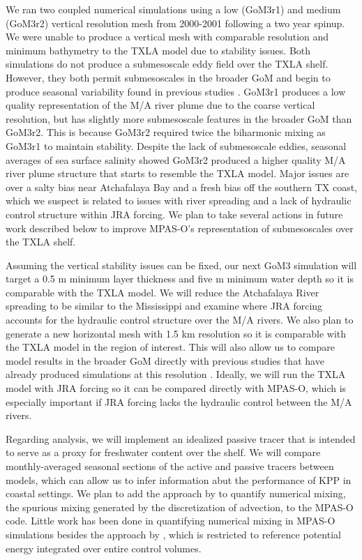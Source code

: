 We ran two coupled numerical simulations using a low (GoM3r1) and medium (GoM3r2) vertical resolution mesh from 2000-2001 following a two year spinup. We were unable to produce a vertical mesh with comparable resolution and minimum bathymetry to the TXLA model due to stability issues. Both simulations do not produce a submesoscale eddy field over the TXLA shelf. However, they both permit submesoscales in the broader GoM and begin to produce seasonal variability found in previous studies \citep{Barkan_2017, liu2021submesoscale}. GoM3r1 produces a low quality representation of the M/A river plume due to the coarse vertical resolution, but has slightly more submesoscale features in the broader GoM than GoM3r2. This is because GoM3r2 required twice the biharmonic mixing as GoM3r1 to maintain stability. Despite the lack of submesoscale eddies, seasonal averages of sea surface salinity showed GoM3r2 produced a higher quality M/A river plume structure that starts to resemble the TXLA model. Major issues are over a salty bias near Atchafalaya Bay and a fresh bias off the southern TX coast, which we suspect is related to issues with river spreading and a lack of hydraulic control structure within JRA forcing. We plan to take several actions in future work described below to improve MPAS-O's representation of submesoscales over the TXLA shelf.

Assuming the vertical stability issues can be fixed, our next GoM3 simulation will target a 0.5 m minimum layer thickness and five m minimum water depth so it is comparable with the TXLA model. We will reduce the Atchafalaya River spreading to be similar to the Mississippi and examine where JRA forcing accounts for the hydraulic control structure over the M/A rivers. We also plan to generate a new horizontal mesh with 1.5 km resolution so it is comparable with the TXLA model in the region of interest. This will also allow us to compare model results in the broader GoM directly with previous studies that have already produced simulations at this resolution \citep{Barkan_2017, bracco2019mesoscale, liu2021submesoscale}. Ideally, we will run the TXLA model with JRA forcing so it can be compared directly with MPAS-O, which is especially important if JRA forcing lacks the hydraulic control between the M/A rivers. 

Regarding analysis, we will implement an idealized passive tracer that is intended to serve as a proxy for freshwater content over the shelf. We will compare monthly-averaged seasonal sections of the active and passive tracers between models, which can allow us to infer information abut the performance of KPP in coastal settings. We plan to add the approach by \cite{Klingbeil_2014} to quantify numerical mixing, the spurious mixing generated by the discretization of advection, to the MPAS-O code. Little work has been done in quantifying numerical mixing in MPAS-O simulations besides the approach by \cite{winters1995available}, which is restricted to reference potential energy integrated over entire control volumes.

